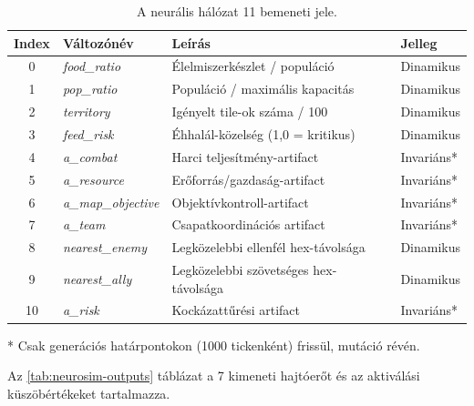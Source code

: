 \begin{table}[h]
  \centering
  \caption{A neurális hálózat 11 bemeneti jele.}
  \label{tab:neurosim-inputs}
  \begin{tabular}{|c|l|l|l|}
    \hline
    \textbf{Index} & \textbf{Változónév} & \textbf{Leírás} & \textbf{Jelleg} \\
    \hline
    0 & \textit{food\_ratio}         & Élelmiszerkészlet / populáció         & Dinamikus \\
    1 & \textit{pop\_ratio}          & Populáció / maximális kapacitás        & Dinamikus \\
    2 & \textit{territory}           & Igényelt tile-ok száma / 100           & Dinamikus \\
    3 & \textit{feed\_risk}          & Éhhalál-közelség (1{,}0 = kritikus)   & Dinamikus \\
    4 & \textit{a\_combat}           & Harci teljesítmény-artifact             & Invariáns* \\
    5 & \textit{a\_resource}         & Erőforrás/gazdaság-artifact             & Invariáns* \\
    6 & \textit{a\_map\_objective}   & Objektívkontroll-artifact               & Invariáns* \\
    7 & \textit{a\_team}             & Csapatkoordinációs artifact             & Invariáns* \\
    8 & \textit{nearest\_enemy}      & Legközelebbi ellenfél hex-távolsága    & Dinamikus \\
    9 & \textit{nearest\_ally}       & Legközelebbi szövetséges hex-távolsága & Dinamikus \\
   10 & \textit{a\_risk}             & Kockázattűrési artifact                 & Invariáns* \\
    \hline
  \end{tabular}
  \begin{flushleft}
    \small{* Csak generációs határpontokon (1000 tickenként) frissül, mutáció révén.}
  \end{flushleft}
\end{table}

Az \ref{tab:neurosim-outputs} táblázat a 7 kimeneti hajtóerőt és az aktiválási küszöbértékeket tartalmazza.

